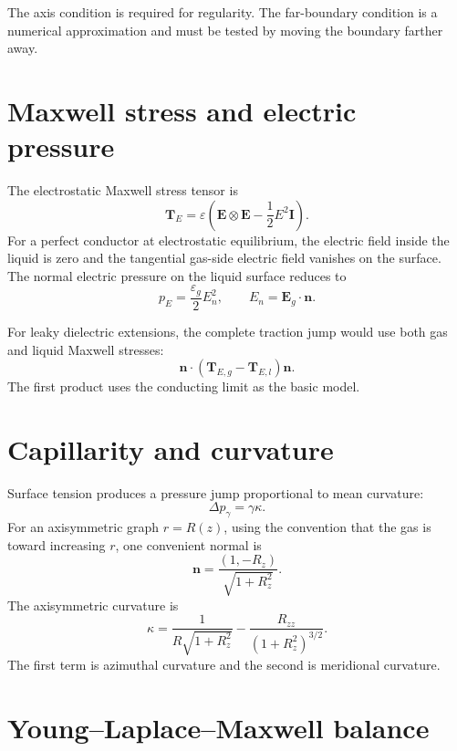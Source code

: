 \documentclass[11pt]{article}
\newcommand{\eps}{\varepsilon}
\newcommand{\vE}{\mathbf{E}}
\newcommand{\vn}{\mathbf{n}}
\newcommand{\vT}{\mathbf{T}}
\begin{document}
The axis condition is required for regularity.  The far-boundary condition is a numerical approximation and must be tested by moving the boundary farther away.

\section{Maxwell stress and electric pressure}

The electrostatic Maxwell stress tensor is
\begin{equation}
    \vT_E=\eps\left(\vE\otimes\vE-\frac12E^2\mathbf I\right).
\end{equation}
For a perfect conductor at electrostatic equilibrium, the electric field inside the liquid is zero and the tangential gas-side electric field vanishes on the surface.  The normal electric pressure on the liquid surface reduces to
\begin{equation}
    p_E=\frac{\eps_g}{2}E_n^2,
    \qquad
    E_n=\vE_g\cdot\vn.
\end{equation}

For leaky dielectric extensions, the complete traction jump would use both gas and liquid Maxwell stresses:
\begin{equation}
    \vn\cdot(\vT_{E,g}-\vT_{E,l})\vn.
\end{equation}
The first product uses the conducting limit as the basic model.

\section{Capillarity and curvature}

Surface tension produces a pressure jump proportional to mean curvature:
\begin{equation}
    \Delta p_\gamma=\gamma\kappa.
\end{equation}
For an axisymmetric graph \(r=R(z)\), using the convention that the gas is toward increasing \(r\), one convenient normal is
\begin{equation}
    \vn=\frac{(1,-R_z)}{\sqrt{1+R_z^2}}.
\end{equation}
The axisymmetric curvature is
\begin{equation}
    \kappa
    =
    \frac{1}{R\sqrt{1+R_z^2}}
    -
    \frac{R_{zz}}{(1+R_z^2)^{3/2}}.
    \label{eq:curvature}
\end{equation}
The first term is azimuthal curvature and the second is meridional curvature.

\section{Young--Laplace--Maxwell balance}
\end{document}
